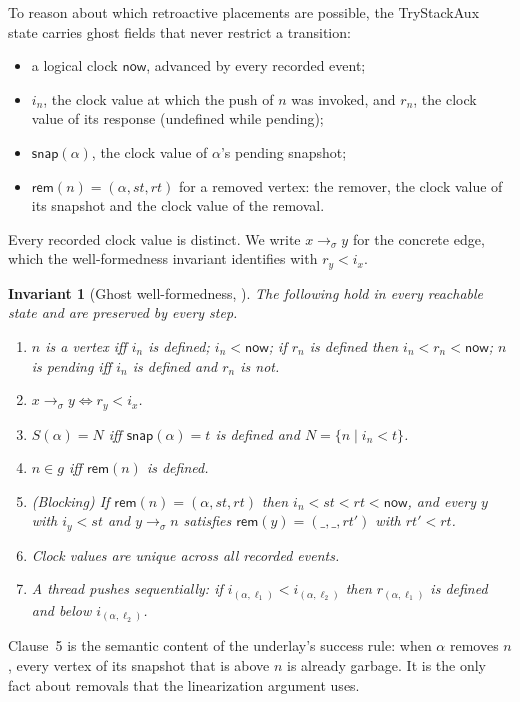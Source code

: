 \documentclass[11pt]{article}
\newtheorem{invariant}[lemma]{Invariant}
\theoremstyle{definition}
\theoremstyle{remark}
\newcommand{\conc}{\sigma}
\newcommand{\code}[1]{\texttt{\detokenize{#1}}}
\newcommand{\now}{\mathsf{now}}
\newcommand{\rem}{\mathsf{rem}}
\newcommand{\snap}{\mathsf{snap}}
\begin{document}
To reason about which retroactive placements are possible, the TryStackAux
state carries ghost fields that never restrict a transition:
\begin{itemize}[nosep]
\item a logical clock \(\now\), advanced by every recorded event;
\item \(i_n\), the clock value at which the push of \(n\) was invoked, and
  \(r_n\), the clock value of its response (undefined while pending);
\item \(\snap(\alpha)\), the clock value of \(\alpha\)'s pending snapshot;
\item \(\rem(n)=(\alpha,st,rt)\) for a removed vertex: the remover, the
  clock value of its snapshot and the clock value of the removal.
\end{itemize}
Every recorded clock value is distinct.  We write \(x\to_\conc y\) for the
concrete edge, which the well-formedness invariant identifies with
\(r_y<i_x\).

\begin{invariant}[Ghost well-formedness, \code{tsa_ghost_wf}]
\label{inv:wf}
The following hold in every reachable state and are preserved by every step.
\begin{enumerate}[nosep]
\item \(n\) is a vertex iff \(i_n\) is defined; \(i_n<\now\); if \(r_n\) is
  defined then \(i_n<r_n<\now\); \(n\) is pending iff \(i_n\) is defined
  and \(r_n\) is not.
\item \(x\to_\conc y\iff r_y<i_x\).
\item \(S(\alpha)=N\) iff \(\snap(\alpha)=t\) is defined and
  \(N=\{n\mid i_n<t\}\).
\item \(n\in g\) iff \(\rem(n)\) is defined.
\item (\emph{Blocking}) If \(\rem(n)=(\alpha,st,rt)\) then
  \(i_n<st<rt<\now\), and every \(y\) with \(i_y<st\) and \(y\to_\conc n\)
  satisfies \(\rem(y)=(\_,\_,rt')\) with \(rt'<rt\).
\item Clock values are unique across all recorded events.
\item A thread pushes sequentially: if \(i_{(\alpha,\ell_1)}<i_{(\alpha,\ell_2)}\)
  then \(r_{(\alpha,\ell_1)}\) is defined and below \(i_{(\alpha,\ell_2)}\).
\end{enumerate}
\end{invariant}

Clause~5 is the semantic content of the underlay's success rule: when
\(\alpha\) removes \(n\), every vertex of its snapshot that is above \(n\) is
already garbage.  It is the only fact about removals that the linearization
argument uses.
\end{document}
